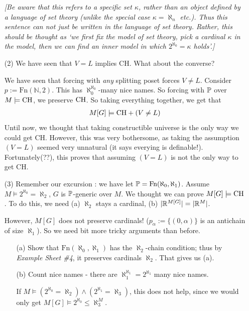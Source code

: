 \documentclass[12pt,a4paper]{article}
\begin{document}
\begin{itemize}
\emph{[Be aware that this refers to a specific set $\kappa$, rather than an object defined by a language of set theory (unlike the special case $\kappa = \aleph_n$ etc.). Thus this sentence can not just be written in the language of set theory. Rather, this should be thought as `we first fix the model of set theory, pick a cardinal $\kappa$ in the model, then we can find an inner model in which $2^{\aleph_0} = \kappa$ holds'.]}

\item[(2)] We have seen that $V=L$ implies CH. What about the converse?
\s

We have seen that forcing with \emph{any} splitting poset forces $V\neq L$. Consider $p:=\text{Fn}(\mathbb{N}, 2)$. This has $\aleph_0^{\aleph_0}$-many nice names. So forcing with $\mathbb{P}$ over $M\models \text{CH}$, we preserve $\text{CH}$. So taking everything together, we get that
\begin{align*}
M[G] \models \text{CH} + (V\neq L)
\end{align*}
Until now, we thought that taking constructible universe is the only way we could get CH. However, this was very bothersome, as taking the assumption $(V =L)$ seemed very unnatural (it says everying is definable!). Fortunately(??), this proves that assuming $(V=L)$ is not the only way to get CH.

\item[(3)] Remember our excursion : we have let $\mathbb{P} = \text{Fn}(\aleph_0, \aleph_1)$. Assume $M \models 2^{\aleph_0} = \aleph_2$, $G$ is $\mathbb{P}$-generic over $M$. We thought we can prove $M[G]\models \text{CH}$. To do this, we need (a) $\aleph_2$ stays a cardinal, (b) $|\mathbb{R}^{M[G]}| = |\mathbb{R}^M|$.

\quad However, $M[G]$ does not preserve cardinals! ($p_{\alpha} := \{(0, \alpha)\}$ is an antichain of size $\aleph_1$). So we need bit more tricky arguments than before.

\begin{itemize}
\item[(a)] Show that $\text{Fn}(\aleph_0, \aleph_1)$ has the $\aleph_2$-chain condition; thus by \emph{Example Sheet \#4}, it preserves cardinals $\aleph_2$. That gives us (a).
\item[(b)] Count nice names - there are $\aleph_1^{\aleph_1}= 2^{\aleph_1}$ many nice names. 

\quad If $M\models (2^{\aleph_0} = \aleph_2) \wedge (2^{\aleph_1} = \aleph_3)$, this does not help, since we would only get $M[G] \models 2^{\aleph_0} \leq \aleph_3^M$.


\end{itemize}
\end{itemize}
\end{document}
